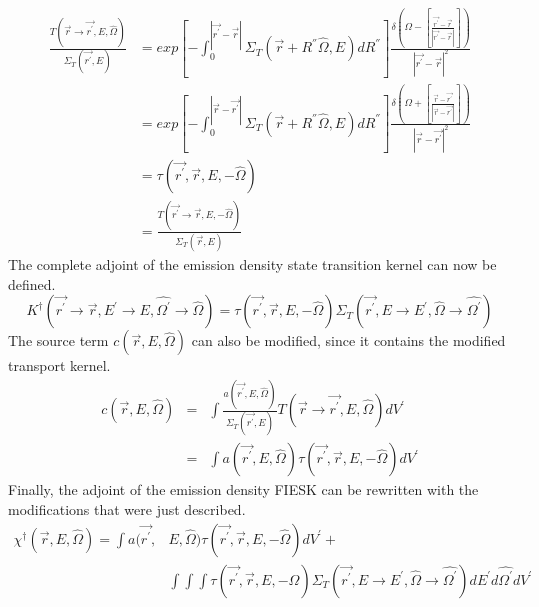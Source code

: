 \begin{align}
  \frac{T(\vec{r} \to \vec{r^{'}},E,\hat{\Omega})}{\Sigma_T(\vec{r^{'}},E)} & =
  exp\left[-\int_0^{|\vec{r^{'}} - \vec{r}|} 
    \Sigma_T \left(\vec{r} + R^{''}\hat{\Omega},E \right) dR^{''} 
    \right] \frac{\delta \left(\Omega - \left[\frac{\vec{r^{'}} - \vec{r}}
      {|\vec{r^{'}} - \vec{r}|}\right]\right)}
       {|\vec{r^{'}} - \vec{r}|^2} \nonumber \\
       & = exp\left[-\int_0^{|\vec{r} - \vec{r^{'}}|} 
    \Sigma_T \left(\vec{r} + R^{''}\hat{\Omega},E \right) dR^{''} 
    \right] \frac{\delta \left(\Omega + \left[\frac{\vec{r} - \vec{r^{'}}}
      {|\vec{r} - \vec{r^{'}}|}\right]\right)}
       {|\vec{r} - \vec{r^{'}}|^2} \nonumber \\
       & = \tau(\vec{r^{'}},\vec{r},E,-\hat{\Omega}) \\
       & = \frac{T(\vec{r^{'}} \to \vec{r},E,-\hat{\Omega})}
       {\Sigma_T(\vec{r},E)}
\end{align}
The complete adjoint of the emission density state transition kernel can now be 
defined.
\begin{equation}
  K^{\dagger}(\vec{r^{'}} \to \vec{r},E^{'} \to E,
  \hat{\Omega^{'}} \to \hat{\Omega}) = 
  \tau(\vec{r^{'}},\vec{r},E,-\hat{\Omega}) 
  \Sigma_T(\vec{r^{'}},E \to E^{'},\hat{\Omega} \to \hat{\Omega^{'}})
\end{equation}
The source term $c(\vec{r},E,\hat{\Omega})$ can also be modified, since it
contains the modified transport kernel.
\begin{eqnarray}
  c(\vec{r},E,\hat{\Omega}) & = & \int \frac{a(\vec{r^{'}},E,\hat{\Omega})}
  {\Sigma_T(\vec{r^{'}},E)}T(\vec{r} \to \vec{r^{'}},E,\hat{\Omega}) dV^{'} 
  \nonumber \\
  & = & \int a(\vec{r^{'}},E,\hat{\Omega}) 
  \tau(\vec{r^{'}},\vec{r},E,-\hat{\Omega}) dV^{'}
\end{eqnarray}
Finally, the adjoint of the emission density FIESK can be rewritten with the 
modifications that were just described.
\begin{equation}
  \begin{split}
    \chi^{\dagger}(\vec{r},E,\hat{\Omega}) =  \int a(\vec{r^{'}},&E,\hat{\Omega}) 
    \tau(\vec{r^{'}},\vec{r},E,-\hat{\Omega}) dV^{'} + \\
    & \int\int\int  \tau(\vec{r^{'}},\vec{r},E,-\hat{\Omega}) 
    \Sigma_T(\vec{r^{'}},E \to E^{'},\hat{\Omega} \to \hat{\Omega^{'}})
    dE^{'}d\hat{\Omega^{'}}dV^{'}
  \end{split}
  \label{eq:adjoint_of_emission_density_integral_eqn_2}
\end{equation}
 
